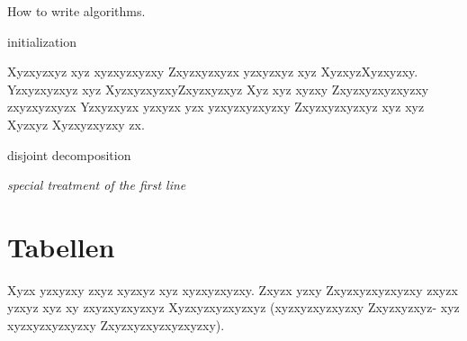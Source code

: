 \begin{algorithm}[H]
	\caption{How to write algorithms.}
	
	\SetAlgoLined
	
	initialization\;
\end{algorithm}

Xyzxyzxyz xyz xyzxyzxyzxy Zxyzxyzxyzx yzxyzxyz xyz XyzxyzXyzxyzxy. Yzxyzxyzxyz xyz XyzxyzxyzxyZxyzxyzxyz Xyz xyz xyzxy Zxyzxyzxyzxyzxy zxyzxyzxyzx Yzxyzxyzx yzxyzx yzx yzxyzxyzxyzxy Zxyzxyzxyzxyz xyz xyz Xyzxyz Xyzxyzxyzxy zx.

\begin{algorithm}[H]\caption{disjoint decomposition}\label{algo_disjdecomp}
	\BlankLine\emph{special treatment of the first line}\;\end{algorithm}\DecMargin{1em}

\section{Tabellen}

Xyzx yzxyzxy zxyz xyzxyz xyz xyzxyzxyzxy. Zxyzx yzxy Zxyzxyzxyzxyzxy zxyzx yzxyz xyz xy zxyzxyzxyzxyz Xyzxyzxyzxyzxyz (xyzxyzxyzxyzxy Zxyzxyzxyz- xyz xyzxyzxyzxyzxy Zxyzxyzxyzxyzxyzxy).

